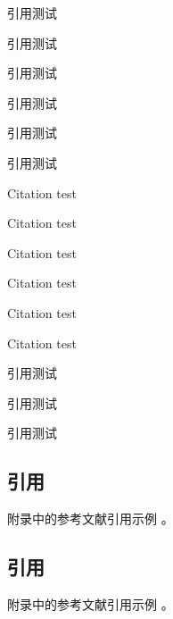 \documentclass[degree=bachelor]{thuthesis}
\begin{document}
\START
\showoutput

引用\citet{chendengyuan2000guoshi}测试\par
引用\citet[42]{chendengyuan2000guoshi}测试\par
引用\citep{chendengyuan2000guoshi}测试\par
引用\citep[42]{chendengyuan2000guoshi}测试\par
引用\citep[见][]{woerdelun2012jingji}测试\par
引用\citep[见][42]{woerdelun2012jingji}测试\par

Citation \citet{crawford1995future} test\par
Citation \citet[42]{crawford1995future} test\par
Citation\citep{crawford1995future} test\par
Citation\citep[42]{crawford1995future} test\par
Citation \citep[see][]{crawford1995future} test\par
Citation \citep[see][42]{crawford1995future} test\par

引用\citep{chendengyuan2000guoshi}测试\par
引用\citep{woerdelun2012jingji,crawford1995future}测试\par
引用\citep{chenggenwei1999hongshui,weinstein1974pathogenic,zhonghua1984linchuang}测试\par

\nocite{*}

\printbibliography


\appendix

\begin{survey}
  \section{引用}
  附录\cite{crawford1995future}中的参考文献引用\cite{weinstein1974pathogenic}示例
  \cite{crawford1995future,weinstein1974pathogenic}。
  
  \printbibliography
\end{survey}

\begin{translation}
  \section{引用}
  附录\cite{crawford1995future}中的参考文献引用\cite{weinstein1974pathogenic}示例
  \cite{crawford1995future,weinstein1974pathogenic}。
  
  \printbibliography

  \begin{translation-index}
    \nocite{kanamori1998shaking}
    \nocite{myburg2014genome}
    \nocite{tachibana2005electronic}
    
    \printbibliography
  \end{translation-index}
\end{translation}

\clearpage
\OMIT
\end{document}
